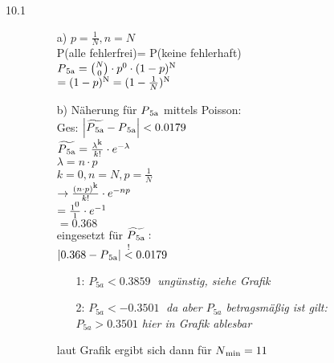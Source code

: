 \documentclass[a4paper]{article}
\begin{document}
\begin{description}
\newpage		
\item[10.1] 
		\begin{itemize}
			\item[a)] $p=\frac{1}{N}, n=N$\\
			
								P(alle fehlerfrei)= P(keine fehlerhaft)\\
								
								$P\textsubscript{5a}= \binom{N}{0} \cdot p\textsuperscript{0} \cdot (1-p)\textsuperscript{N}$\\
								$=(1-p)\textsuperscript{N} = (1-\frac{1}{N})\textsuperscript{N}$\\
			
			\item[b)] Näherung für $P\textsubscript{5a}$ mittels Poisson:\\
								
								Ges: $\left|\widetilde{P\textsubscript{5a}}-P\textsubscript{5a}\right| < 0.0179$\\
								
								$\widetilde{P\textsubscript{5a}} = \frac{\lambda\textsuperscript{k}}{k!} \cdot e^{-\lambda}$\\ 			
								$\lambda= n\cdot p$\\
								$k=0, n=N, p=\frac{1}{N}$\\
								$\rightarrow \frac{(n\cdot p)\textsuperscript{k}}{k!} \cdot e^{-np}$\\
								$= \frac{1\textsuperscript{0}}{1} \cdot e^{-1}$\\
								$=0.368$\\
								
								eingesetzt für $\widetilde{P\textsubscript{5a}}:$\\
								
								$\left|0.368-P\textsubscript{5a}\right| \stackrel{!}{<} 0.0179$\\
								\begin{itemize}
									\item[1:] $P_{5a} < 0.3859 \;$ \textit{ungünstig, siehe Grafik}
									\item[2:] $P_{5a} < -0.3501 \;$ \textit{da aber $P_{5a}$ betragsmäßig ist gilt:}\\
														$P_{5a} > 0.3501$ \textit{hier in Grafik ablesbar}
								\end{itemize}
								
								
								laut Grafik ergibt sich dann für $N\textsubscript{min}= 11$\\
										

\end{itemize}
\end{description}
\end{document}
